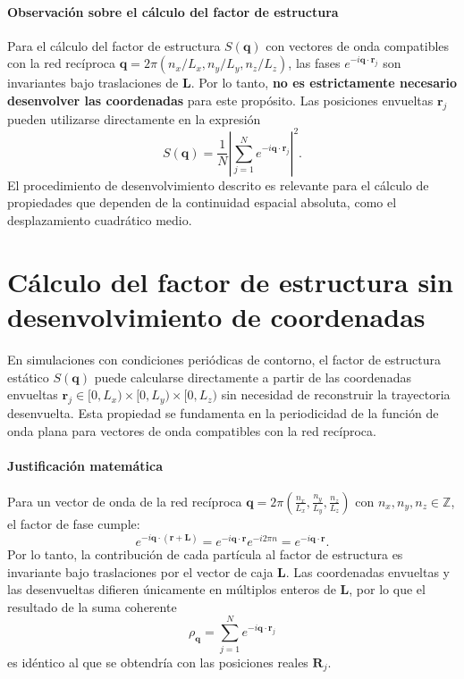 \documentclass{tufte-handout}
\begin{document}
\paragraph*{Observación sobre el cálculo del factor de estructura}

Para el cálculo del factor de estructura $S(\mathbf{q})$ con vectores de onda compatibles con la red recíproca $\mathbf{q} = 2\pi(n_x/L_x, n_y/L_y, n_z/L_z)$, las fases $e^{-i\mathbf{q}\cdot\mathbf{r}_j}$ son invariantes bajo traslaciones de $\mathbf{L}$. Por lo tanto, \textbf{no es estrictamente necesario desenvolver las coordenadas} para este propósito. Las posiciones envueltas $\mathbf{r}_j$ pueden utilizarse directamente en la expresión 
\begin{equation}
S(\mathbf{q}) = \frac{1}{N}\left| \sum_{j=1}^N e^{-i\mathbf{q}\cdot\mathbf{r}_j} \right|^2.
\end{equation}
El procedimiento de desenvolvimiento descrito es relevante para el cálculo de propiedades que dependen de la continuidad espacial absoluta, como el desplazamiento cuadrático medio.

\newpage

\section{Cálculo del factor de estructura sin desenvolvimiento de coordenadas}

En simulaciones con condiciones periódicas de contorno, el factor de estructura estático $S(\mathbf{q})$ puede calcularse directamente a partir de las coordenadas envueltas $\mathbf{r}_j \in [0, L_x)\times[0, L_y)\times[0, L_z)$ sin necesidad de reconstruir la trayectoria desenvuelta. Esta propiedad se fundamenta en la periodicidad de la función de onda plana para vectores de onda compatibles con la red recíproca.

\paragraph*{Justificación matemática}

Para un vector de onda de la red recíproca $\mathbf{q} = 2\pi\left(\frac{n_x}{L_x}, \frac{n_y}{L_y}, \frac{n_z}{L_z}\right)$ con $n_x,n_y,n_z \in \mathbb{Z}$, el factor de fase cumple:
\begin{equation}
e^{-i\mathbf{q}\cdot(\mathbf{r} + \mathbf{L})} = e^{-i\mathbf{q}\cdot\mathbf{r}} e^{-i 2\pi n} = e^{-i\mathbf{q}\cdot\mathbf{r}}.
\end{equation}
Por lo tanto, la contribución de cada partícula al factor de estructura es invariante bajo traslaciones por el vector de caja $\mathbf{L}$. Las coordenadas envueltas y las desenvueltas difieren únicamente en múltiplos enteros de $\mathbf{L}$, por lo que el resultado de la suma coherente
\begin{equation}
\rho_{\mathbf{q}} = \sum_{j=1}^{N} e^{-i\mathbf{q}\cdot\mathbf{r}_j}
\end{equation}
es idéntico al que se obtendría con las posiciones reales $\mathbf{R}_j$.
\end{document}
